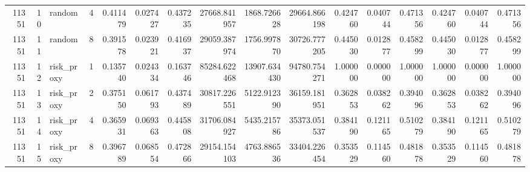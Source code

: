 \begin{tabular}{rrlrrrrrrrrrrrrr}
11351 & 10 & random & 4 & 0.411479 & 0.027427 & 0.437235 & 27668.841957 & 1868.726628 & 29664.866198 & 0.424760 & 0.040744 & 0.471356 & 0.424760 & 0.040744 & 0.471356 \\
11351 & 11 & random & 8 & 0.391578 & 0.023921 & 0.416937 & 29059.387974 & 1756.997870 & 30726.777205 & 0.445030 & 0.012877 & 0.458299 & 0.445030 & 0.012877 & 0.458299 \\
11351 & 12 & risk\_proxy & 1 & 0.135740 & 0.024334 & 0.163746 & 85284.622468 & 13907.634430 & 94780.754271 & 1.000000 & 0.000000 & 1.000000 & 1.000000 & 0.000000 & 1.000000 \\
11351 & 13 & risk\_proxy & 2 & 0.375150 & 0.061793 & 0.437489 & 30817.226551 & 5122.912390 & 36159.181951 & 0.362853 & 0.038262 & 0.394096 & 0.362853 & 0.038262 & 0.394096 \\
11351 & 14 & risk\_proxy & 4 & 0.365931 & 0.069363 & 0.445808 & 31706.084927 & 5435.215786 & 35373.051537 & 0.384190 & 0.121165 & 0.510279 & 0.384190 & 0.121165 & 0.510279 \\
11351 & 15 & risk\_proxy & 8 & 0.396789 & 0.068554 & 0.472866 & 29154.154103 & 4763.886536 & 33404.226454 & 0.353529 & 0.114560 & 0.481878 & 0.353529 & 0.114560 & 0.481878 \\
\bottomrule
\end{tabular}

